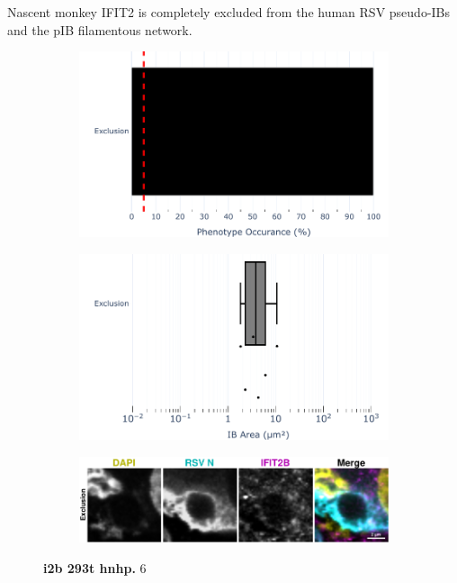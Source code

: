 Nascent monkey IFIT2 is completely excluded from the human RSV pseudo-IBs and the pIB filamentous network.

\begin{figure}
    \begin{subfigure}{0.495\textwidth}
        \caption{}
        \includegraphics[width=1\linewidth]{10. Chapter 5/Figs/02. pIB/03. IFIT2B/01. bar_i2b_293t.pdf} 
    \end{subfigure}
    \begin{subfigure}{0.495\textwidth}
        \caption{}
        \includegraphics[width=1\linewidth]{10. Chapter 5/Figs/02. pIB/03. IFIT2B/02. box_i2b_293t.pdf}
    \end{subfigure}
    \begin{subfigure}{1\textwidth}
        \caption{}
        \includegraphics[width=1\linewidth]{10. Chapter 5/Figs/02. pIB/03. IFIT2B/03. i2b-293t-hnhp.pdf} 
    \end{subfigure}
    \caption[i2b 293t hnhp]{\textbf{i2b 293t hnhp.} 6}
    \label{fig:i2b 293t hnhp}
\end{figure}

